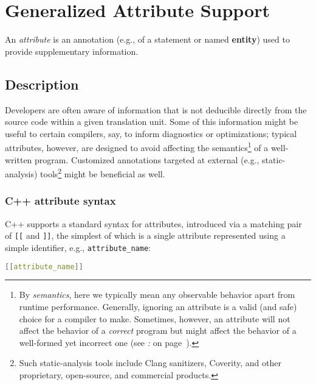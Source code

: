 \newpage
\section[Attribute Syntax]{Generalized Attribute Support}\label{attributes}



An \emph{attribute} is an annotation (e.g., of a statement or named
\textbf{entity}) used to provide supplementary information.

\subsection[Description]{Description}\label{description}

Developers are often aware of information that is not deducible directly
from the source code within a given translation unit. Some of this
information might be useful to certain compilers, say, to inform
diagnostics or optimizations; typical attributes, however, are designed
to avoid affecting the semantics{\cprotect\footnote{By \emph{semantics}, here
we typically mean any observable behavior apart from runtime
performance. Generally, ignoring an attribute is a valid (and safe)
choice for a compiler to make. Sometimes, however, an
attribute will not affect the behavior of a \emph{correct} program but might affect the behavior of a well-formed yet incorrect one (see
{\it{}:} {\it{}} on page~\pageref{delineating-explicit-assumptions-in-code-to-achieve-better-optimizations}).}} of a
well-written program. Customized annotations targeted at external (e.g.,
static-analysis) tools{\cprotect\footnote{Such static-analysis tools include Clang sanitizers, Coverity, and other
proprietary, open-source, and commercial products.}} might be
beneficial as well.

\subsubsection[C++ attribute syntax]{C++ attribute syntax}\label{c++-attribute-syntax}

C++ supports a standard syntax for attributes, introduced via a matching
pair of \texttt{[[} and \texttt{]]}, the simplest of which is a single
attribute represented using a simple identifier, e.g.,
\texttt{attribute\_name}:

\begin{lstlisting}[language=C++]
[[attribute_name]]
\end{lstlisting}

